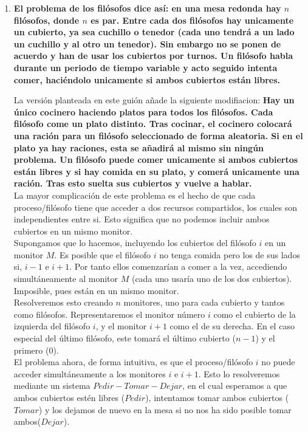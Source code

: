 \documentclass[11pt,a4paper]{article}
\begin{document}
\begin{enumerate}
\item \large{\textbf{El problema de los filósofos dice así: en una mesa redonda hay $n$ filósofos, donde $n$ es par. Entre cada dos filósofos hay unicamente un cubierto, ya sea cuchillo o tenedor (cada uno tendrá a un lado un cuchillo y al otro un tenedor). Sin embargo no se ponen de acuerdo y han de usar los cubiertos por turnos. Un filósofo habla durante un periodo de tiempo variable y acto seguido intenta comer, haciéndolo unicamente si ambos cubiertos están libres. }} 

\large{La versión planteada en este guión añade la siguiente modifiacion: \textbf{Hay un único cocinero haciendo platos para todos los filósofos. Cada filósofo come un plato distinto. Tras cocinar, el cocinero colocará una ración para un filósofo seleccionado de forma aleatoria. Si en el plato ya hay raciones, esta se añadirá al mismo sin ningún problema. Un filósofo puede comer unicamente si ambos cubiertos están libres y si hay comida en su plato, y comerá unicamente una ración. Tras esto suelta sus cubiertos y vuelve a hablar.}} \\

La mayor complicación de este problema es el hecho de que cada proceso/filósofo tiene que acceder a dos recursos compartidos, los cuales son independientes entre si. Esto significa que no podemos incluir ambos cubiertos en un mismo monitor. \\ 

Supongamos que lo hacemos, incluyendo los cubiertos del filósofo $i$ en un monitor $M$. Es posible que el filósofo $i$ no tenga comida pero los de sus lados si, $i-1$ e $i+1$. Por tanto ellos comenzarían a comer a la vez, accediendo simultáneamente al monitor $M$ (cada uno usaría uno de los dos cubiertos). Imposible, pues están en un mismo monitor. \\

Resolveremos esto creando $n$ monitores, uno para cada cubierto y tantos como filósofos. Representaremos el monitor número $i$ como el cubierto de la izquierda del filósofo $i$, y el monitor $i+1$ como el de su derecha. En el caso especial del último filósofo, este tomará el último cubierto ($n-1$) y el primero ($0$). \\

El problema ahora, de forma intuitiva, es que el proceso/filósofo $i$ no puede acceder simultáneamente a los monitores $i$ e $i+1$. Esto lo resolveremos mediante un sistema $Pedir - Tomar - Dejar$, en el cual esperamos a que ambos cubiertos estén libres ($Pedir$), intentamos tomar ambos cubiertos ($Tomar$) y los dejamos de nuevo en la mesa si no nos ha sido posible tomar ambos($Dejar$). \\


\end{enumerate}
\end{document}
